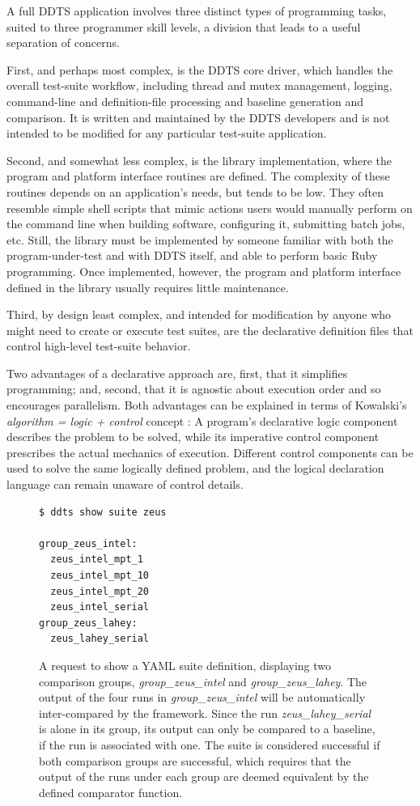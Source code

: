 \documentclass[conference]{IEEEtran}
\begin{document}
A full DDTS application involves three distinct types of programming tasks, suited to three programmer skill levels, a division that leads to a useful separation of concerns.

First, and perhaps most complex, is the DDTS core driver, which handles the overall test-suite workflow, including thread and mutex management, logging, command-line and definition-file processing and baseline generation and comparison. It is written and maintained by the DDTS developers and is not intended to be modified for any particular test-suite application.

Second, and somewhat less complex, is the library implementation, where the program and platform interface routines are defined. The complexity of these routines depends on an application's needs, but tends to be low. They often resemble simple shell scripts that mimic actions users would manually perform on the command line when building software, configuring it, submitting batch jobs, etc. Still, the library must be implemented by someone familiar with both the program-under-test and with DDTS itself, and able to perform basic Ruby programming. Once implemented, however, the program and platform interface defined in the library usually requires little maintenance.

Third, by design least complex, and intended for modification by anyone who might need to create or execute test suites, are the declarative definition files that control high-level test-suite behavior.

Two advantages of a declarative approach are, first, that it simplifies programming; and, second, that it is agnostic about execution order and so encourages parallelism. Both advantages can be explained in terms of Kowalski's \emph{algorithm = logic + control} concept \cite{logic-control}: A program's declarative logic component describes the problem to be solved, while its imperative control component prescribes the actual mechanics of execution. Different control components can be used to solve the same logically defined problem, and the logical declaration language can remain unaware of control details.

\begin{figure}[!t]
{\small \begin{verbatim}
$ ddts show suite zeus

group_zeus_intel: 
  zeus_intel_mpt_1
  zeus_intel_mpt_10
  zeus_intel_mpt_20
  zeus_intel_serial
group_zeus_lahey: 
  zeus_lahey_serial
\end{verbatim} }
\caption{A request to show a YAML suite definition, displaying two comparison groups, \emph{group\_zeus\_intel} and \emph{group\_zeus\_lahey}. The output of the four runs in \emph{group\_zeus\_intel} will be automatically inter-compared by the framework. Since the run \emph{zeus\_lahey\_serial} is alone in its group, its output can only be compared to a baseline, if the run is associated with one. The suite is considered successful if both comparison groups are successful, which requires that the output of the runs under each group are deemed equivalent by the defined comparator function.}
\label{figure:2}
\end{figure}
\end{document}
